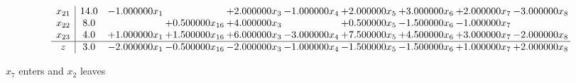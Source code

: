 \documentclass[10pt]{article}
\begin{document}
\[\begin{array}{c| c c@{\hskip 2pt} c@{\hskip 2pt} c@{\hskip 2pt} c@{\hskip 2pt} c@{\hskip 2pt} c@{\hskip 2pt} c@{\hskip 2pt} c@{\hskip 2pt} }
 x_{21}   &  14.0 & -1.000000 x_{1} &   & + 2.000000 x_{3} & -1.000000 x_{4} & + 2.000000 x_{5} & + 3.000000 x_{6} & + 2.000000 x_{7} & -3.000000 x_{8}\\
 x_{22}   &  8.0  &   & + 0.500000 x_{16} & + 4.000000 x_{3} &   & + 0.500000 x_{5} & -1.500000 x_{6} & -1.000000 x_{7} &   \\
 x_{23}   &  4.0 & + 1.000000 x_{1} & + 1.500000 x_{16} & + 6.000000 x_{3} & -3.000000 x_{4} & + 7.500000 x_{5} & + 4.500000 x_{6} & + 3.000000 x_{7} & -2.000000 x_{8}\\
\hline
z    &  3.0 & -2.000000 x_{1} & -0.500000 x_{16} & -2.000000 x_{3} & -1.000000 x_{4} & -1.500000 x_{5} & -1.500000 x_{6} & + 1.000000 x_{7} & + 2.000000 x_{8}\\
\end{array}\]


 $ x_{7} $ enters and $ x_{2} $ leaves 
\end{document}
